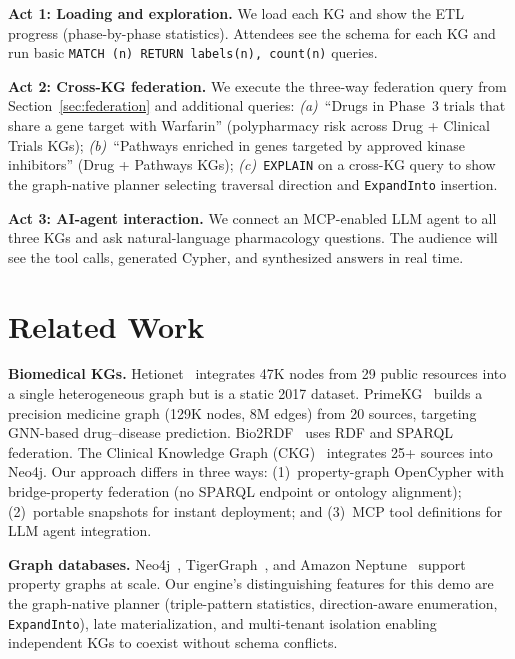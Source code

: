 \documentclass[sigconf]{acmart}
\begin{document}
\smallskip\noindent\textbf{Act 1: Loading and exploration.}
We load each KG and show the ETL progress (phase-by-phase
statistics).  Attendees see the schema for each KG and run
basic \texttt{MATCH (n) RETURN labels(n), count(n)} queries.

\smallskip\noindent\textbf{Act 2: Cross-KG federation.}
We execute the three-way federation query from
Section~\ref{sec:federation} and additional queries:
\emph{(a)}~``Drugs in Phase~3 trials that share a gene target
with Warfarin'' (polypharmacy risk across Drug + Clinical Trials KGs);
\emph{(b)}~``Pathways enriched in genes targeted by approved
kinase inhibitors'' (Drug + Pathways KGs);
\emph{(c)}~\texttt{EXPLAIN} on a cross-KG query to show the
graph-native planner selecting traversal direction and
\texttt{ExpandInto} insertion.

\smallskip\noindent\textbf{Act 3: AI-agent interaction.}
We connect an MCP-enabled LLM agent to all three KGs and ask
natural-language pharmacology questions.  The audience will see
the tool calls, generated Cypher, and synthesized answers in
real time.

\section{Related Work}\label{sec:related}

\textbf{Biomedical KGs.}  Hetionet~\cite{himmelstein2017hetionet}
integrates 47K nodes from 29 public resources into a single
heterogeneous graph but is a static 2017 dataset.
PrimeKG~\cite{chandak2023primekg} builds a precision medicine
graph (129K nodes, 8M edges) from 20 sources, targeting GNN-based
drug--disease prediction.
Bio2RDF~\cite{callahan2013bio2rdf} uses RDF and SPARQL federation.
The Clinical Knowledge Graph (CKG)~\cite{santos2022ckg} integrates
25+ sources into Neo4j.  Our approach differs in three ways:
(1)~property-graph OpenCypher with bridge-property federation
(no SPARQL endpoint or ontology alignment);
(2)~portable snapshots for instant deployment; and
(3)~MCP tool definitions for LLM agent integration.

\smallskip\noindent\textbf{Graph databases.}
Neo4j~\cite{neo4j}, TigerGraph~\cite{deutsch2019tigergraph},
and Amazon Neptune~\cite{neptune} support property graphs at
scale.  Our engine's distinguishing features for this demo are
the graph-native planner (triple-pattern statistics,
direction-aware enumeration, \texttt{ExpandInto}), late
materialization, and multi-tenant isolation enabling
independent KGs to coexist without schema conflicts.
\end{document}
